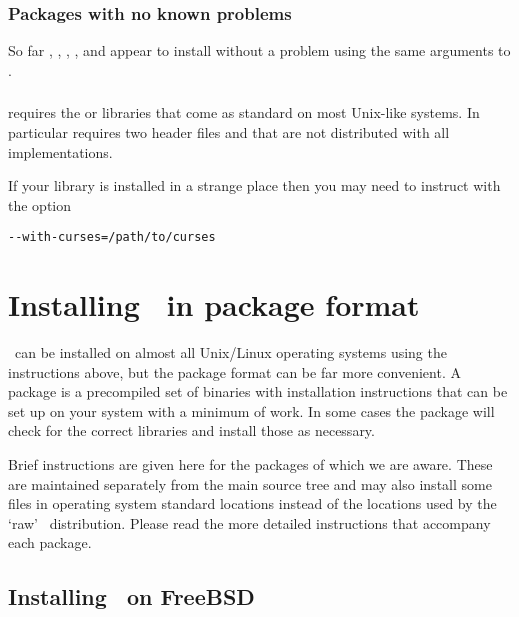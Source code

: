 \documentclass{report}
\begin{document}
\subsubsection{Packages with no known problems}
So far , , ,
,  and  appear to
install without a problem using the same arguments to
.

\subsubsection{}

 requires the  or  libraries 
that come as standard on most Unix-like systems. In particular  
requires two header files  and  that are not 
distributed with all implementations.

If your  
library is installed in a strange place then you may need to instruct 
 with the option 

\begin{verbatim}
--with-curses=/path/to/curses
\end{verbatim}


\section{Installing \EMBOSS\ in package format}
\label{sec:FreeBSD}
\EMBOSS\ can be installed on almost all Unix/Linux operating systems
using the instructions above, but the package format can be far more
convenient.  A package is a precompiled set of binaries with
installation instructions that can be set up on your system with a
minimum of work. In some cases the package will check for the correct
libraries and install those as necessary.

Brief instructions are given here for the packages of which we are
aware. These are maintained separately from the main source tree and
may also install some files in operating system standard locations
instead of the locations used by the `raw' \EMBOSS\
distribution. Please read the more detailed instructions that
accompany each package.

\subsection{Installing \EMBOSS\ on FreeBSD}
\end{document}
